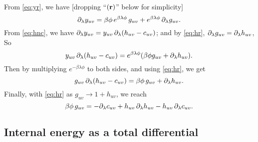 \documentclass[12pt]{article}
\begin{document}
From \eqref{eq:yr}, we have [dropping ``$(\mathbf{r})$'' below for simplicity]
\[
  \partial_\lambda y_{uv}
  =
  \beta \phi \, e^{ \beta \lambda \phi } \, g_{uv}
    +
    e^{ \beta \lambda \phi } \, \partial_\lambda g_{uv}.
\]
From \eqref{eq:hnc}, we have
  $\partial_\lambda y_{uv} = y_{uv} \, \partial_\lambda (h_{uv} - c_{uv})$;
  and by \eqref{eq:hr}, $\partial_\lambda g_{uv} = \partial_\lambda h_{uv}$, So
\[
  y_{uv} \, \partial_\lambda (h_{uv} - c_{uv}) = e^{\beta \lambda \phi }
  ( \beta \phi g_{uv} + \partial_\lambda h_{uv} ).
\]
Then by multiplying $e^{-\beta \lambda \phi}$ to both sides,
and using \eqref{eq:hr}, we get
\[
  g_{uv} \, \partial_\lambda (h_{uv} - c_{uv}) =
  \beta \phi \, g_{uv} + \partial_\lambda h_{uv}.
\]
Finally, with
\eqref{eq:hr}
as $g_{uv} \rightarrow 1 + h_{uv}$,
we reach
\begin{equation}
  \beta \phi \, g_{uv}
  =
  - \partial_\lambda c_{uv} + h_{uv} \, \partial_\lambda h_{uv} - h_{uv} \, \partial_\lambda c_{uv}.
  \label{eq:hc1}
\end{equation}



\subsection{Internal energy as a total differential}
\end{document}

